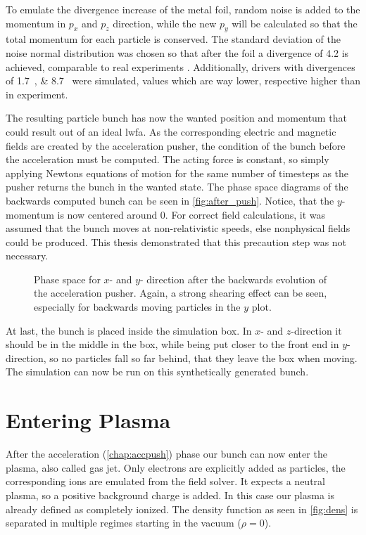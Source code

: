 \documentclass[bachelor_thesis]{subfiles}
\begin{document}
To emulate the divergence increase of the metal foil, random noise is added to the momentum in $p_x$ and $p_z$ direction, while the new $p_y$ will be calculated so that the total momentum for each particle is conserved.
The standard deviation of the noise normal distribution was chosen so that after the foil a divergence of \qty{4.2}{\mrad} is achieved, comparable to real experiments \cite{Schoebel2022}.
Additionally, drivers with divergences of \qtylist{1.7; 8.7}{\mrad} were simulated, values which are way lower, respective higher than in experiment.

The resulting particle bunch has now the wanted position and momentum that could result out of an ideal \gls{lwfa}. As the corresponding electric and magnetic fields are created by the acceleration pusher,
the condition of the bunch before the acceleration must be computed. The acting force is constant, so simply applying Newtons equations of motion for the same number of timesteps as the pusher returns the bunch in the wanted state.
The phase space diagrams of the backwards computed bunch can be seen in \autoref {fig:after_push}. Notice, that the $y$-momentum is now centered around \num{0}. For correct field calculations, it was assumed that the bunch moves at non-relativistic speeds,
else nonphysical fields could be produced. This thesis demonstrated that this precaution step was not necessary. 

\begin{figure}
	\missingfigure{}
	\caption{Phase space for $x$- and $y$- direction after the backwards evolution of the acceleration pusher. Again, a strong shearing effect can be seen, especially for backwards moving particles in the $y$ plot.}
	\label{fig:after_push}
\end{figure}

At last, the bunch is placed inside the simulation box. In $x$- and $z$-direction it should be in the middle in the box, while being put closer to the front end in $y$-direction, so no particles fall so far behind, that they leave the box when moving.
The simulation can now be run on this synthetically generated bunch.

\section{Entering Plasma}\label{chap:plasma}
After the acceleration (\autoref{chap:accpush}) phase our bunch can now enter the plasma, also called gas jet.
Only electrons are explicitly added as particles, the corresponding ions are emulated from the field solver. It expects a neutral plasma, so a positive background charge is added. 
In this case our plasma is already defined as completely ionized. The density function as seen in \autoref{fig:dens} is separated in multiple regimes starting in the vacuum ($\rho=0$). 
\end{document}
